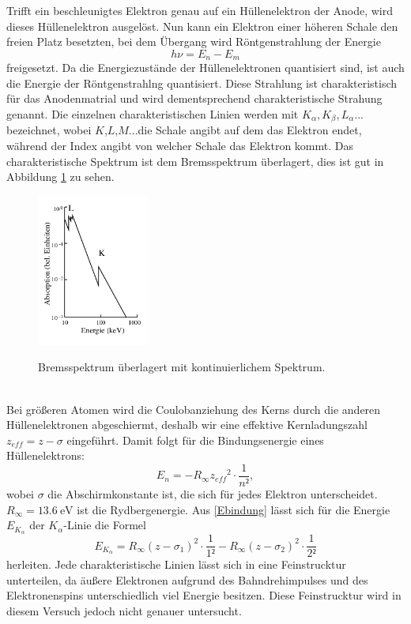 Trifft ein beschleunigtes Elektron genau auf ein Hüllenelektron der Anode,
wird dieses Hüllenelektron ausgelöst. Nun kann ein Elektron einer höheren Schale den
freien Platz besetzten, bei dem Übergang wird Röntgenstrahlung der Energie
\begin{equation}
  h \nu=E_n -E_m
\end{equation}
freigesetzt. Da die Energiezustände der Hüllenelektronen quantisiert sind, ist auch die
Energie der Röntgenstrahlng quantisiert. Diese Strahlung ist charakteristisch für das
Anodenmatrial und wird dementsprechend charakteristische Strahung genannt.
Die einzelnen charakteristischen Linien werden mit $K_{\alpha}, K_{\beta}, L_{\alpha}...$
bezeichnet, wobei $K$,$L$,$M$...die Schale angibt auf dem das Elektron endet, während
der Index angibt von welcher Schale das Elektron kommt. Das charakteristische Spektrum
ist dem Bremsspektrum überlagert, dies ist gut in Abbildung \ref{fig:kont2} zu sehen.
\begin{figure}
  \centering
  \includegraphics[height=5cm]{kont2.png}
  \caption{Bremsspektrum überlagert mit kontinuierlichem Spektrum.}
  \label{fig:kont2}
  \cite{skript}
\end{figure}
\\
Bei größeren Atomen wird die Coulobanziehung des Kerns durch die anderen Hüllenelektronen
abgeschiermt, deshalb wir eine effektive Kernladungszahl $z_{eff}=z-\sigma$
eingeführt. Damit folgt für die Bindungsenergie eines Hüllenelektrons:
\begin{equation}
  E_n= -R_{\infty}{z_{eff}}^{2}\cdot \frac{1}{n²},
  \label{Ebindung}
\end{equation}
wobei $\sigma$ die Abschirmkonstante ist, die sich für jedes Elektron unterscheidet.
$R_{\infty}=\SI{13.6}{\eV}$ ist die Rydbergenergie.
Aus \ref{Ebindung} lässt sich für die Energie $E_{K_{\alpha}}$ der $K_{\alpha}$-Linie
die Formel
\begin{equation}
  E_{K_{\alpha}}=R_{\infty}(z-\sigma_{1})^{2}\cdot\frac{1}{1²}-R_{\infty}(z-\sigma_{2})^{2}\cdot\frac{1}{2²}
\end{equation}
herleiten.
Jede charakteristische Linien lässt sich in eine Feinstrucktur unterteilen, da
äußere Elektronen aufgrund des Bahndrehimpulses und des Elektronenspins unterschiedlich
viel Energie besitzen. Diese Feinstrucktur wird in diesem Versuch jedoch nicht genauer
untersucht.

